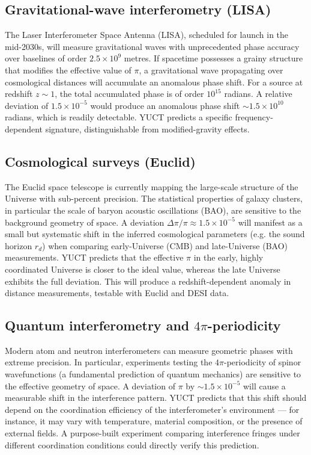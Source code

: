 \documentclass[11pt,a4paper]{article}
\begin{document}
	\subsection{Gravitational-wave interferometry (LISA)}
	
	The Laser Interferometer Space Antenna (LISA), scheduled for launch in the mid-2030s, will measure gravitational waves with unprecedented phase accuracy over baselines of order \(2.5\times10^9\) metres. If spacetime possesses a grainy structure that modifies the effective value of \(\pi\), a gravitational wave propagating over cosmological distances will accumulate an anomalous phase shift. For a source at redshift \(z \sim 1\), the total accumulated phase is of order \(10^{15}\) radians. A relative deviation of \(1.5\times10^{-5}\) would produce an anomalous phase shift \(\sim 1.5\times10^{10}\) radians, which is readily detectable. YUCT predicts a specific frequency-dependent signature, distinguishable from modified-gravity effects.
	
	\subsection{Cosmological surveys (Euclid)}
	
	The Euclid space telescope is currently mapping the large-scale structure of the Universe with sub-percent precision. The statistical properties of galaxy clusters, in particular the scale of baryon acoustic oscillations (BAO), are sensitive to the background geometry of space. A deviation \(\Delta\pi/\pi \approx 1.5\times10^{-5}\) will manifest as a small but systematic shift in the inferred cosmological parameters (e.g. the sound horizon \(r_d\)) when comparing early-Universe (CMB) and late-Universe (BAO) measurements. YUCT predicts that the effective \(\pi\) in the early, highly coordinated Universe is closer to the ideal value, whereas the late Universe exhibits the full deviation. This will produce a redshift-dependent anomaly in distance measurements, testable with Euclid and DESI data.
	
	\subsection{Quantum interferometry and \(4\pi\)-periodicity}
	
	Modern atom and neutron interferometers can measure geometric phases with extreme precision. In particular, experiments testing the \(4\pi\)-periodicity of spinor wavefunctions (a fundamental prediction of quantum mechanics) are sensitive to the effective geometry of space. A deviation of \(\pi\) by \(\sim 1.5\times10^{-5}\) will cause a measurable shift in the interference pattern. YUCT predicts that this shift should depend on the coordination efficiency of the interferometer's environment — for instance, it may vary with temperature, material composition, or the presence of external fields. A purpose-built experiment comparing interference fringes under different coordination conditions could directly verify this prediction.
	
\end{document}
